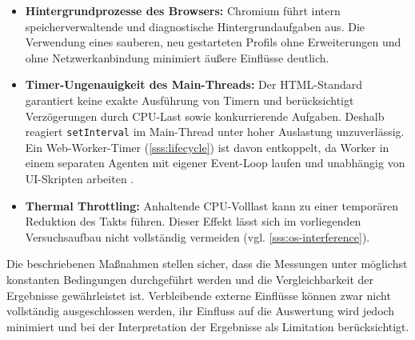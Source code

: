 \begin{itemize}
	\item \textbf{Hintergrundprozesse des Browsers:} Chromium führt intern speicherverwaltende und diagnostische Hintergrundaufgaben aus. Die Verwendung eines sauberen, neu gestarteten Profils ohne Erweiterungen und ohne Netzwerkanbindung minimiert äußere Einflüsse deutlich.
	\item \textbf{Timer-Ungenauigkeit des Main-Threads:} Der HTML-Standard garantiert keine exakte Ausführung von Timern und berücksichtigt Verzögerungen durch CPU-Last sowie konkurrierende Aufgaben. Deshalb reagiert \texttt{setInterval} im Main-Thread unter hoher Auslastung unzuverlässig. Ein Web-Worker-Timer (\cref{sss:lifecycle}) ist davon entkoppelt, da Worker in einem separaten Agenten mit eigener Event-Loop laufen und unabhängig von UI-Skripten arbeiten \cite{whatwg-html-2026}.
	\item \textbf{Thermal Throttling:} Anhaltende CPU-Volllast kann zu einer temporären Reduktion des Takts führen. Dieser Effekt lässt sich im vorliegenden Versuchsaufbau nicht vollständig vermeiden (vgl. \cref{sss:os-interference}). 
\end{itemize}
Die beschriebenen Maßnahmen stellen sicher, dass die Messungen unter möglichst konstanten Bedingungen durchgeführt werden und die Vergleichbarkeit der Ergebnisse gewährleistet ist. Verbleibende externe Einflüsse können zwar nicht vollständig ausgeschlossen werden, ihr Einfluss auf die Auswertung wird jedoch minimiert und bei der Interpretation der Ergebnisse als Limitation berücksichtigt.
